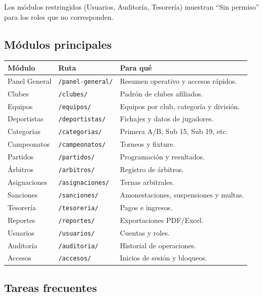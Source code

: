 \documentclass[11pt,a4paper]{article}
\newcommand{\campo}[1]{\texttt{\small #1}}
\begin{document}
Los módulos restringidos (Usuarios, Auditoría, Tesorería) muestran ``Sin
permiso'' para los roles que no corresponden.

\subsection{Módulos principales}

\begin{xltabular}{\textwidth}{@{}l l X@{}}
\toprule
\textbf{Módulo} & \textbf{Ruta} & \textbf{Para qué}\\
\midrule
\endhead
Panel General & \campo{/panel-general/} & Resumen operativo y accesos rápidos.\\
Clubes & \campo{/clubes/} & Padrón de clubes afiliados.\\
Equipos & \campo{/equipos/} & Equipos por club, categoría y división.\\
Deportistas & \campo{/deportistas/} & Fichajes y datos de jugadores.\\
Categorías & \campo{/categorias/} & Primera A/B, Sub 15, Sub 19, etc.\\
Campeonatos & \campo{/campeonatos/} & Torneos y fixture.\\
Partidos & \campo{/partidos/} & Programación y resultados.\\
Árbitros & \campo{/arbitros/} & Registro de árbitros.\\
Asignaciones & \campo{/asignaciones/} & Ternas arbitrales.\\
Sanciones & \campo{/sanciones/} & Amonestaciones, suspensiones y multas.\\
Tesorería & \campo{/tesoreria/} & Pagos e ingresos.\\
Reportes & \campo{/reportes/} & Exportaciones PDF/Excel.\\
Usuarios & \campo{/usuarios/} & Cuentas y roles.\\
Auditoría & \campo{/auditoria/} & Historial de operaciones.\\
Accesos & \campo{/accesos/} & Inicios de sesión y bloqueos.\\
\bottomrule
\end{xltabular}

\subsection{Tareas frecuentes}
\end{document}
